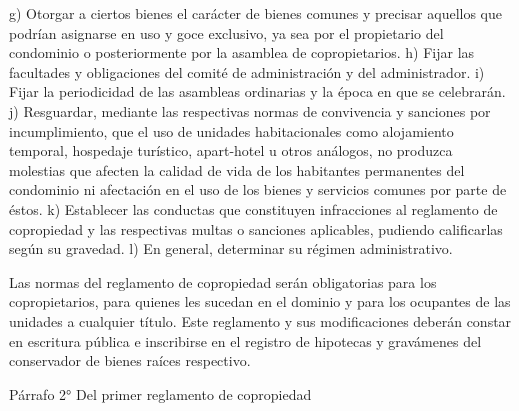     g) Otorgar a ciertos bienes el carácter de bienes comunes y precisar aquellos que podrían asignarse en uso y goce exclusivo, ya sea por el propietario del condominio o posteriormente por la asamblea de copropietarios.
    h) Fijar las facultades y obligaciones del comité de administración y del administrador.
    i) Fijar la periodicidad de las asambleas ordinarias y la época en que se celebrarán.
    j) Resguardar, mediante las respectivas normas de convivencia y sanciones por incumplimiento, que el uso de unidades habitacionales como alojamiento temporal, hospedaje turístico, apart-hotel u otros análogos, no produzca molestias que afecten la calidad de vida de los habitantes permanentes del condominio ni afectación en el uso de los bienes y servicios comunes por parte de éstos.
    k) Establecer las conductas que constituyen infracciones al reglamento de copropiedad y las respectivas multas o sanciones aplicables, pudiendo calificarlas según su gravedad.
    l) En general, determinar su régimen administrativo.
     
    Las normas del reglamento de copropiedad serán obligatorias para los copropietarios, para quienes les sucedan en el dominio y para los ocupantes de las unidades a cualquier título. Este reglamento y sus modificaciones deberán constar en escritura pública e inscribirse en el registro de hipotecas y gravámenes del conservador de bienes raíces respectivo.

     
    Párrafo 2°
    Del primer reglamento de copropiedad


